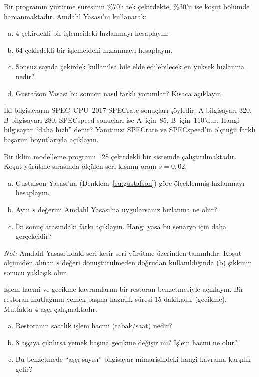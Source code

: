 \begin{alistirma}[\orta]
Bir programın yürütme süresinin \%70'i tek çekirdekte, \%30'u ise koşut bölümde harcanmaktadır. Amdahl Yasası'nı kullanarak:
\begin{enumerate}[(a)]
    \item 4 çekirdekli bir işlemcideki hızlanmayı hesaplayın.
    \item 64 çekirdekli bir işlemcideki hızlanmayı hesaplayın.
    \item Sonsuz sayıda çekirdek kullanılsa bile elde edilebilecek en yüksek hızlanma nedir?
    \item Gustafson Yasası bu sonucu nasıl farklı yorumlar? Kısaca açıklayın.
\end{enumerate}
\end{alistirma}

\begin{alistirma}[\orta]
İki bilgisayarın SPEC~CPU~2017 SPECrate sonuçları şöyledir: A bilgisayarı 320, B bilgisayarı 280. SPECspeed sonuçları ise A~için~85, B~için~110'dur. Hangi bilgisayar ``daha hızlı'' denir? Yanıtınızı SPECrate ve SPECspeed'in ölçtüğü farklı başarım boyutlarıyla açıklayın.
\end{alistirma}

\begin{alistirma}[\orta]
Bir iklim modelleme programı 128 çekirdekli bir sistemde çalıştırılmaktadır. Koşut yürütme sırasında ölçülen seri kısmın oranı $s = 0{,}02$.
\begin{enumerate}[(a)]
    \item Gustafson Yasası'na (Denklem~\ref{eq:gustafson}) göre ölçeklenmiş hızlanmayı hesaplayın.
    \item Aynı $s$ değerini Amdahl Yasası'na uygularsanız hızlanma ne olur?
    \item İki sonuç arasındaki farkı açıklayın. Hangi yasa bu senaryo için daha gerçekçidir?
\end{enumerate}
\emph{Not:} Amdahl Yasası'ndaki seri kesir seri yürütme üzerinden tanımlıdır. Koşut ölçümden alınan $s$ değeri dönüştürülmeden doğrudan kullanıldığında (b) şıkkının sonucu yaklaşık olur.
\end{alistirma}


\begin{alistirma}[\kolay]
İşlem hacmi ve gecikme kavramlarını bir restoran benzetmesiyle açıklayın. Bir restoran mutfağının yemek başına hazırlık süresi 15 dakikadır (gecikme). Mutfakta 4 aşçı çalışmaktadır.
\begin{enumerate}[(a)]
    \item Restoranın saatlik işlem hacmi (tabak/saat) nedir?
    \item 8 aşçıya çıkılırsa yemek başına gecikme değişir mi? İşlem hacmi ne olur?
    \item Bu benzetmede ``aşçı sayısı'' bilgisayar mimarisindeki hangi kavrama karşılık gelir?
\end{enumerate}
\end{alistirma}

